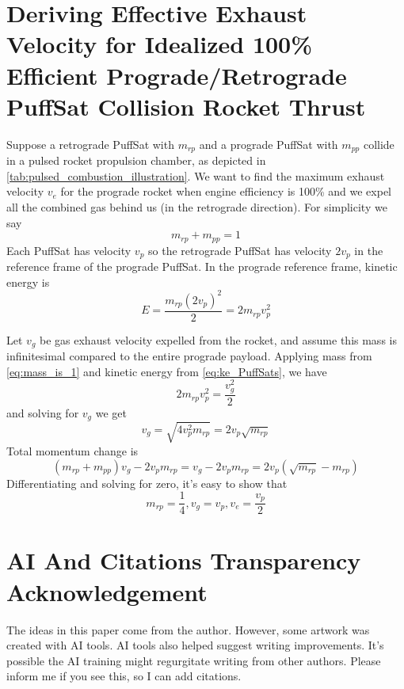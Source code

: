 \documentclass{article}
\begin{document}
\section{Deriving Effective Exhaust Velocity for Idealized 100\% Efficient Prograde/Retrograde PuffSat Collision Rocket Thrust}\label{sec:dv_effective}
Suppose a retrograde PuffSat with $m_{rp}$ and a prograde PuffSat with $m_{pp}$ collide in a pulsed rocket propulsion chamber, as depicted in \autoref{tab:pulsed_combustion_illustration}.  We want to find the maximum exhaust velocity $v_e$ for the prograde rocket  when engine efficiency is 100\% and we expel all the combined gas behind us (in the retrograde direction).   For simplicity we say 
\begin{equation}
m_{rp} + m_{pp} = 1\label{eq:mass_is_1}
\end{equation} 
Each PuffSat has velocity $v_p$ so the retrograde PuffSat has velocity $2v_p$ in the reference frame of the prograde PuffSat.   In the prograde reference frame, kinetic energy is
\begin{equation}
E = \frac{m_{rp} (2v_p)^2}{2} = 2m_{rp}v_p^2\label{eq:ke_PuffSats}
\end{equation}

Let $v_g$ be gas exhaust velocity expelled from the rocket, and assume this mass is infinitesimal compared to the entire prograde payload.  Applying mass from \autoref{eq:mass_is_1}
 and kinetic energy from \autoref{eq:ke_PuffSats}, we have 
 \begin{equation}
 2m_{rp}v_p^2= \frac{v_g^2}{2}
 \end{equation}
 and solving for $v_g$ we get 
 \begin{equation}
 v_g = \sqrt{4v_p^2m_{rp}} = 2v_p\sqrt{m_{rp}} \label{eq:vg_result}
 \end{equation}
 Total momentum change is 
 \[(m_{rp} + m_{pp})v_g - 2v_pm_{rp} = v_g-2v_pm_{rp} = 2v_p(\sqrt{m_{rp}} - m_{rp}) \]
Differentiating and solving for zero, it's easy to show that 
 \begin{equation}
 m_{rp} = \frac{1}{4}, \label{eq:max_m_rp}
 v_g = v_p,
 v_e= \frac{v_p}{2}
 \end{equation}

 \section{AI And Citations Transparency Acknowledgement}
 The ideas in this paper come from the author.  However, some artwork was created with AI tools.  AI tools also helped suggest writing improvements.  It's possible the AI training might regurgitate writing from other authors.   Please inform me if you see this, so I can add citations.  
\end{document}
